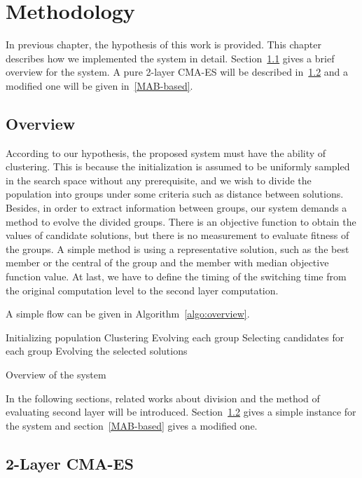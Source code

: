 \chapter{Methodology} \label{ch:method}

In previous chapter, the hypothesis of this work is provided.
This chapter describes how we implemented the system in detail.
Section~\ref{sec:overview}
gives a brief overview for the system.
A pure 2-layer CMA-ES will be described in~\ref{sec:2layer} and a
modified one will be given in~\ref{MAB-based}.

\section{Overview} \label{sec:overview}

According to our hypothesis, the proposed system must have the ability of
clustering.
This is because the initialization is assumed to be uniformly
sampled in the search space without any prerequisite, and we wish to divide the
population into groups under some criteria such as distance between solutions.
Besides, in order to extract information between groups, our system
demands a method to evolve the divided groups.
There is an objective function to obtain the values of candidate
solutions, but there is no measurement to evaluate fitness of the
groups.
A simple method is using a representative solution, such as the best
member or the central of the group and the member with median objective
function value.
At last, we have to define the timing of the switching time from the
original computation level to the second layer computation. 

A simple flow can be given in Algorithm~\ref{algo:overview}.

\begin{algorithm}[H]
  \label{algo:overview}
  Initializing population\;
	Clustering\;
  {
    {
    Evolving each group\;
    }
    Selecting candidates for each group\;
    Evolving the selected solutions\;
  }
  \caption{Overview of the system}
\end{algorithm}
In the following sections, related works about
division and the method of evaluating second layer will be introduced.
Section~\ref{sec:2layer}
gives a simple instance for the system and section~\ref{MAB-based} gives a
modified one.

\section{2-Layer CMA-ES} \label{sec:2layer}

